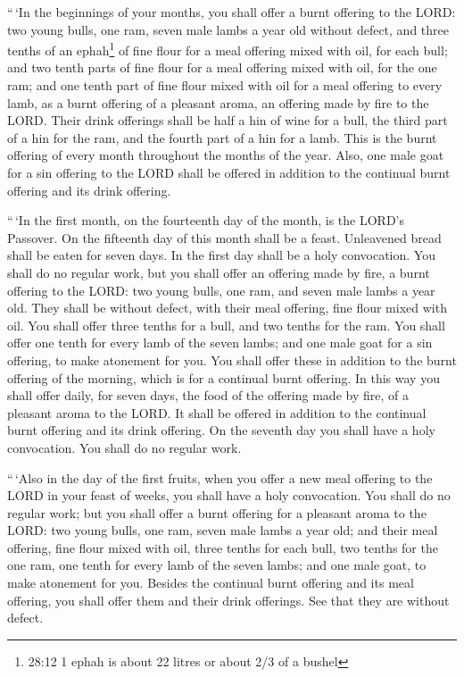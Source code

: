  ``\,`In the beginnings of your months, you shall offer a
burnt offering to the LORD: two young bulls, one ram, seven male lambs a
year old without defect,  and three tenths of an
ephah\footnote{28:12 1 ephah is about 22 litres or about 2/3 of a bushel}
of fine flour for a meal offering mixed with oil, for each bull; and two
tenth parts of fine flour for a meal offering mixed with oil, for the
one ram;  and one tenth part of fine flour mixed with oil
for a meal offering to every lamb, as a burnt offering of a pleasant
aroma, an offering made by fire to the LORD.  Their drink
offerings shall be half a hin of wine for a bull, the third part of a
hin for the ram, and the fourth part of a hin for a lamb. This is the
burnt offering of every month throughout the months of the year.
 Also, one male goat for a sin offering to the LORD shall
be offered in addition to the continual burnt offering and its drink
offering.

 ``\,`In the first month, on the fourteenth day of the
month, is the LORD's Passover.  On the fifteenth day of
this month shall be a feast. Unleavened bread shall be eaten for seven
days.  In the first day shall be a holy convocation. You
shall do no regular work,  but you shall offer an offering
made by fire, a burnt offering to the LORD: two young bulls, one ram,
and seven male lambs a year old. They shall be without defect,
 with their meal offering, fine flour mixed with oil. You
shall offer three tenths for a bull, and two tenths for the ram.
 You shall offer one tenth for every lamb of the seven
lambs;  and one male goat for a sin offering, to make
atonement for you.  You shall offer these in addition to
the burnt offering of the morning, which is for a continual burnt
offering.  In this way you shall offer daily, for seven
days, the food of the offering made by fire, of a pleasant aroma to the
LORD. It shall be offered in addition to the continual burnt offering
and its drink offering.  On the seventh day you shall have
a holy convocation. You shall do no regular work.

 ``\,`Also in the day of the first fruits, when you offer a
new meal offering to the LORD in your feast of weeks, you shall have a
holy convocation. You shall do no regular work;  but you
shall offer a burnt offering for a pleasant aroma to the LORD: two young
bulls, one ram, seven male lambs a year old;  and their
meal offering, fine flour mixed with oil, three tenths for each bull,
two tenths for the one ram,  one tenth for every lamb of
the seven lambs;  and one male goat, to make atonement for
you.  Besides the continual burnt offering and its meal
offering, you shall offer them and their drink offerings. See that they
are without defect.

